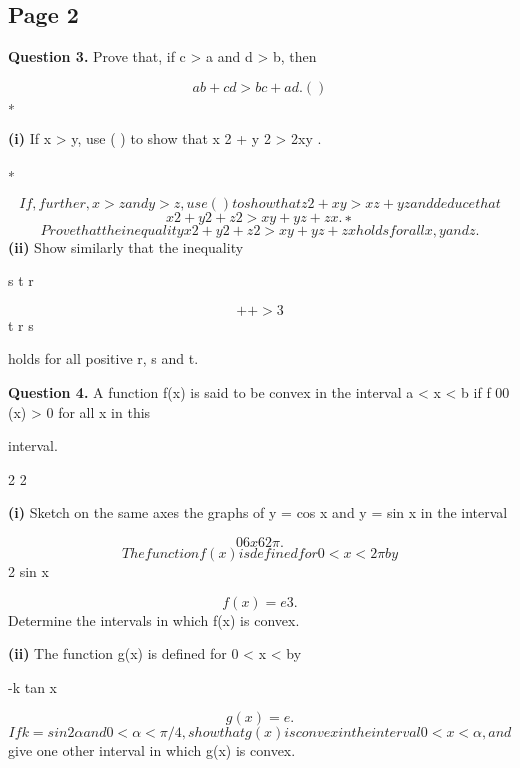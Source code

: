 \documentclass[12pt]{article}
\begin{document}
\subsection*{Page 2}
\begin{flushleft}
\bigskip\textbf{Question 3.} Prove that, if c > a and d > b, then\par
\[ab + cd > bc + ad . ( )\]
∗\par
\textbf{(i)} If x > y, use ( ) to show that x 2 + y 2 > 2xy .\par
∗\par
\[If, further, x > z and y > z, use ( ) to show that z 2 + xy > xz + yz and deduce that\]
\[x 2 + y 2 + z 2 > xy + yz + zx . ∗\]
\[Prove that the inequality x 2 + y 2 + z 2 > xy + yz + zx holds for all x, y and z.\]
\textbf{(ii)} Show similarly that the inequality\par
s t r\par
\[+ + > 3\]
t r s\par
holds for all positive r, s and t.\par
[Note: The final part of this question differs (though not substantially) from what appeared\par
in the actual examination since this was found to be unsatisfactory (though not incorrect) in\par
a way that had not been anticipated.]\par
\bigskip\textbf{Question 4.} A function f(x) is said to be convex in the interval a < x < b if f 00 (x) > 0 for all x in this\par
interval.\par
2 2\par
\textbf{(i)} Sketch on the same axes the graphs of y = cos x and y = sin x in the interval\par
\[0 6 x 6 2\pi.\]
\[The function f(x) is defined for 0 < x < 2\pi by\]
2 sin x\par
\[f(x) = e 3 .\]
Determine the intervals in which f(x) is convex.\par
\textbf{(ii)} The function g(x) is defined for 0 < x < \pi by\par
-k tan x\par
\[g(x) = e .\]
\[If k = sin 2α and 0 < α < \pi/4, show that g(x) is convex in the interval 0 < x < α, and\]
give one other interval in which g(x) is convex.\par
\end{flushleft}
\end{document}
